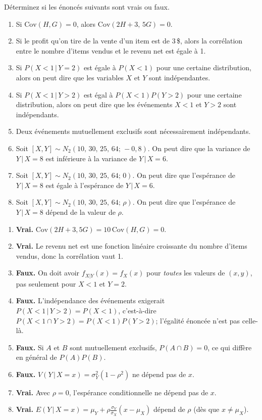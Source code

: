 \begin{exercice}
Déterminez si les énoncés suivants sont vrais ou faux.
\begin{enumerate}[label=(\alph*)]
  \item Si $\mathrm{Cov}(H,G)=0$, alors $\mathrm{Cov}(2H+3,\,5G)=0$.
  \item Si le profit qu'on tire de la vente d'un item est de 3\,\$, alors la corrélation
  entre le nombre d'items vendus et le revenu net est égale à 1.
  \item Si $P(X<1\,|\,Y=2)$ est égale à $P(X<1)$ pour une certaine distribution, alors on
  peut dire que les variables $X$ et $Y$ sont indépendantes.
  \item Si $P(X<1\,|\,Y>2)$ est égal à $P(X<1)P(Y>2)$ pour une certaine distribution, alors
  on peut dire que les événements $X<1$ et $Y>2$ sont indépendants.
  \item Deux événements mutuellement exclusifs sont nécessairement indépendants.
  \item Soit $[X,Y]\sim N_2(10,\,30,\,25,\,64;\,-0,8)$. On peut dire que la variance de
  $Y\,|\,X=8$ est inférieure à la variance de $Y\,|\,X=6$.
  \item Soit $[X,Y]\sim N_2(10,\,30,\,25,\,64;\,0)$. On peut dire que l'espérance de
  $Y\,|\,X=8$ est égale à l'espérance de $Y\,|\,X=6$.
  \item Soit $[X,Y]\sim N_2(10,\,30,\,25,\,64;\,\rho)$. On peut dire que l'espérance de
  $Y\,|\,X=8$ dépend de la valeur de $\rho$.
\end{enumerate}
\begin{solution}
\begin{enumerate}[label=(\alph*)]
  \item \textbf{Vrai.} $\mathrm{Cov}(2H+3,5G)=10\,\mathrm{Cov}(H,G)=0$.
  \item \textbf{Vrai.} Le revenu net est une fonction linéaire croissante du nombre d'items
  vendus, donc la corrélation vaut 1.
  \item \textbf{Faux.} On doit avoir $f_{X|Y}(x)=f_X(x)$ pour \emph{toutes} les valeurs de
  $(x,y)$, pas seulement pour $X<1$ et $Y=2$.
  \item \textbf{Faux.} L'indépendance des événements exigerait
  $P(X<1\,|\,Y>2)=P(X<1)$, c'est-à-dire $P(X<1\cap Y>2)=P(X<1)P(Y>2)$; l'égalité énoncée
  n'est pas celle-là.
  \item \textbf{Faux.} Si $A$ et $B$ sont mutuellement exclusifs, $P(A\cap B)=0$, ce qui
  diffère en général de $P(A)P(B)$.
  \item \textbf{Faux.} $V(Y\,|\,X=x)=\sigma_Y^2(1-\rho^2)$ ne dépend pas de $x$.
  \item \textbf{Vrai.} Avec $\rho=0$, l'espérance conditionnelle ne dépend pas de $x$.
  \item \textbf{Vrai.} $E(Y\,|\,X=x)=\mu_Y+\rho\frac{\sigma_Y}{\sigma_X}(x-\mu_X)$ dépend de
  $\rho$ (dès que $x\neq\mu_X$).
\end{enumerate}
\end{solution}
\end{exercice}

